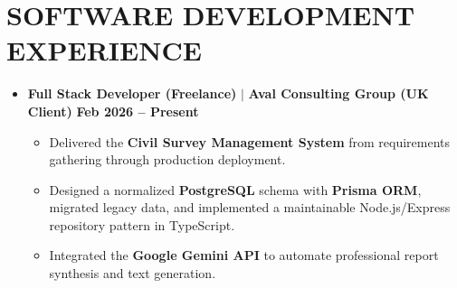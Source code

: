 \documentclass[10pt,a4paper]{article}
\begin{document}
\section{SOFTWARE DEVELOPMENT EXPERIENCE}

\begin{itemize}[leftmargin=1em, label={}]
    \item \textbf{Full Stack Developer (Freelance)} $|$ \textbf{Aval Consulting Group (UK Client)} \hfill \textbf{Feb 2026 -- Present}
    \begin{itemize}
        \item Delivered the \textbf{Civil Survey Management System} from requirements gathering through production deployment.
        \item Designed a normalized \textbf{PostgreSQL} schema with \textbf{Prisma ORM}, migrated legacy data, and implemented a maintainable Node.js/Express repository pattern in TypeScript.
        \item Integrated the \textbf{Google Gemini API} to automate professional report synthesis and text generation.
    \end{itemize}

    \vspace{6pt}


\end{itemize}
\end{document}
